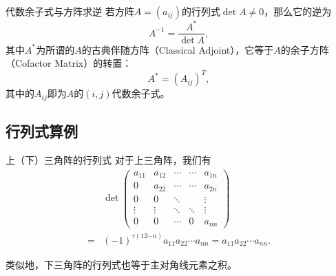 
\begin{frame}

\begin{block}{代数余子式与方阵求逆}
若方阵$A = (a_{ij})$的行列式$\det A \neq 0$，那么它的逆为
$$A^{-1} = \dfrac{A^*}{\det A},$$
其中$A^*$为所谓的$A$的古典伴随方阵（Classical Adjoint），它等于$A$的余子方阵（Cofactor Matrix）的转置：
$$A^* = (A_{ij})^T,$$
其中的$A_{ij}$即为$A$的$(i,j)$代数余子式。
\end{block}

\end{frame}


\subsection{行列式算例}


\begin{frame}

\begin{block}{上（下）三角阵的行列式}
对于上三角阵，我们有
$$
\begin{aligned}
& \det \begin{pmatrix}
a_{11} & a_{12} & \cdots & \cdots & a_{1n} \\ 0 & a_{22} & \cdots & \cdots & a_{2n} \\ 0 & 0 & \ddots & & \vdots \\ \vdots & \vdots & \ddots & \ddots & \vdots \\ 0 & 0 & \cdots & 0 & a_{nn} \end{pmatrix} \\
= & (-1)^{\tau(12\cdots n)}a_{11}a_{22}\cdots a_{nn} = a_{11}a_{22}\cdots a_{nn}.
\end{aligned}
$$

\vspace{1em}
\pause

类似地，下三角阵的行列式也等于主对角线元素之积。
\end{block}

\end{frame}


